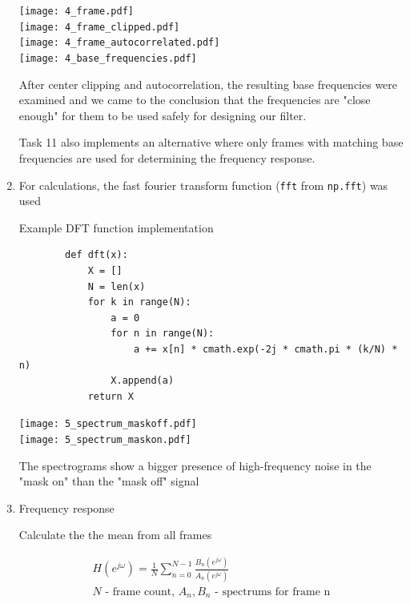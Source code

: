 \documentclass[a4paper, 11pt]{article}
\begin{document}
\begin{enumerate}
        \newpage
        \texttt{[image: 4\_frame.pdf]} \\
        \texttt{[image: 4\_frame\_clipped.pdf]} \\
        \texttt{[image: 4\_frame\_autocorrelated.pdf]} \\
        \texttt{[image: 4\_base\_frequencies.pdf]}

        After center clipping and autocorrelation, the resulting base frequencies were examined
        and we came to the conclusion that the frequencies are "close enough"
        for them to be used safely for designing our filter.

        Task 11 also implements an alternative where only frames with matching base frequencies are used for
        determining the frequency response.

        \newpage
        \item
        For calculations, the fast fourier transform function (\texttt{fft} from \texttt{np.fft}) was used

        Example DFT function implementation

        \begin{verbatim}
        def dft(x):
            X = []
            N = len(x)
            for k in range(N):
                a = 0
                for n in range(N):
                    a += x[n] * cmath.exp(-2j * cmath.pi * (k/N) * n)
                X.append(a)
            return X
        \end{verbatim}

        \texttt{[image: 5\_spectrum\_maskoff.pdf]} \\
        \texttt{[image: 5\_spectrum\_maskon.pdf]}

        The spectrograms show a bigger presence of high-frequency noise in the "mask on" than the "mask off" signal

        \newpage
        \item
        Frequency response

        Calculate the the mean from all frames

        \begin{gather*}
            H(e^{j\omega}) = \frac{1}{N} \sum_{n=0}^{N-1} \frac{ B_n(e^{j\omega}) }{ A_n(e^{j\omega}) } \\
            N \text{ - frame count, } A_n, B_n \text{ - spectrums for frame n}
        \end{gather*}


\end{enumerate}
\end{document}
